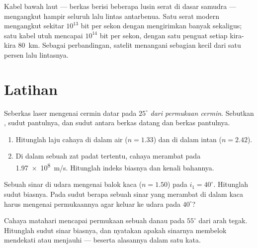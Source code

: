 \begin{remark}\label{rem:g10:refraction:datarates}
Kabel bawah laut --- berkas berisi beberapa lusin serat di dasar
samudra --- mengangkut hampir seluruh lalu lintas antarbenua. Satu serat
modern mengangkut sekitar $10^{13}$ bit per sekon dengan mengirimkan
banyak  sekaligus; satu kabel utuh mencapai $10^{14}$
bit per sekon, dengan satu penguat setiap kira-kira \qty{80}{km}.
Sebagai perbandingan, satelit menangani sebagian kecil dari satu persen
lalu lintasnya.
\end{remark}

\section{Latihan}

\begin{exercise}[$\star$]\label{exo:g10:refraction:1}
Seberkas laser mengenai cermin datar pada $25^\circ$ \emph{dari
permukaan cermin}. Sebutkan , sudut pantulnya, dan sudut
antara berkas datang dan berkas pantulnya.
\end{exercise}

\begin{exercise}[$\star$]\label{exo:g10:refraction:2}
\begin{enumerate}
  \item Hitunglah laju cahaya di dalam air ($n = 1.33$) dan di dalam
        intan ($n = 2.42$).
  \item Di dalam sebuah zat padat tertentu, cahaya merambat pada
        \qty{1.97e8}{m/s}. Hitunglah indeks biasnya dan kenali
        bahannya.
\end{enumerate}
\end{exercise}

\begin{exercise}[$\star$]\label{exo:g10:refraction:3}
Sebuah sinar di udara mengenai balok kaca ($n = 1.50$) pada
$i_1 = 40^\circ$. Hitunglah sudut biasnya. Pada sudut berapa sebuah
sinar yang merambat di dalam kaca harus mengenai permukaannya agar
keluar ke udara pada $40^\circ$?
\end{exercise}

\begin{exercise}[$\star$]\label{exo:g10:refraction:4}
Cahaya matahari mencapai permukaan sebuah danau pada $55^\circ$ dari
arah tegak. Hitunglah sudut sinar biasnya, dan nyatakan apakah sinarnya
membelok mendekati atau menjauhi  --- beserta alasannya
dalam satu kata.
\end{exercise}

